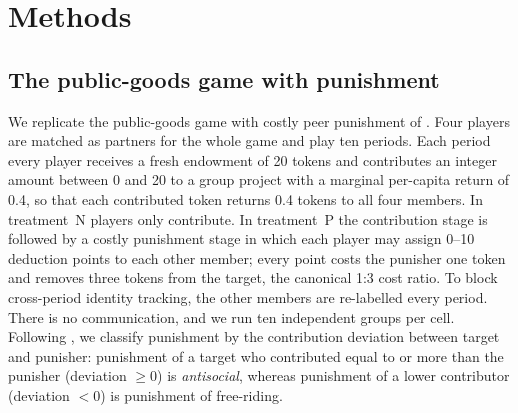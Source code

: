 
\section{Methods}

\subsection{The public-goods game with punishment}
We replicate the public-goods game with costly peer punishment of \textcite{herrmann2008antisocial}. Four players are matched as partners for the whole game and play ten periods. Each period every player receives a fresh endowment of 20 tokens and contributes an integer amount between 0 and 20 to a group project with a marginal per-capita return of 0.4, so that each contributed token returns 0.4 tokens to all four members. In treatment~N players only contribute. In treatment~P the contribution stage is followed by a costly punishment stage in which each player may assign 0--10 deduction points to each other member; every point costs the punisher one token and removes three tokens from the target, the canonical 1:3 cost ratio. To block cross-period identity tracking, the other members are re-labelled every period. There is no communication, and we run ten independent groups per cell. Following \textcite{herrmann2008antisocial}, we classify punishment by the contribution deviation between target and punisher: punishment of a target who contributed equal to or more than the punisher (deviation $\geq 0$) is \emph{antisocial}, whereas punishment of a lower contributor (deviation $<0$) is punishment of free-riding.

